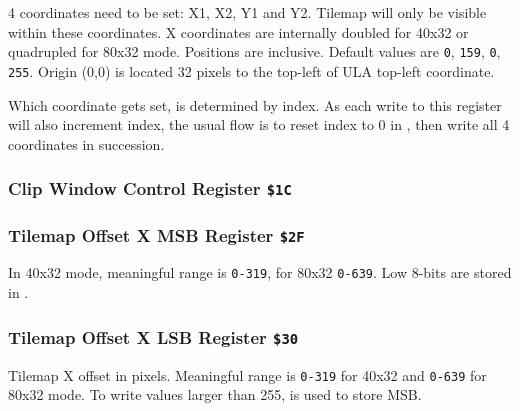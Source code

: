 \documentclass[12pt,twoside,openright,a4paper]{book}
\begin{document}
\begin{NextPort}
\end{NextPort}

4 coordinates need to be set: X1, X2, Y1 and Y2. Tilemap will only be visible within these coordinates. X coordinates are internally doubled for 40x32 or quadrupled for 80x32 mode. Positions are inclusive. Default values are {\tt 0}, {\tt 159}, {\tt 0}, {\tt 255}. Origin (0,0) is located 32 pixels to the top-left of ULA top-left coordinate.

Which coordinate gets set, is determined by index. As each write to this register will also increment index, the usual flow is to reset index to 0 in , then write all 4 coordinates in succession.


\subsubsection{Clip Window Control Register {\tt \$1C}}



\subsubsection{Tilemap Offset X MSB Register {\tt \$2F}}

\begin{NextPort}
\end{NextPort}

In 40x32 mode, meaningful range is {\tt 0-319}, for 80x32 {\tt 0-639}. Low 8-bits are stored in .


\subsubsection{Tilemap Offset X LSB Register {\tt \$30}}

\begin{NextPort}
\end{NextPort}

Tilemap X offset in pixels. Meaningful range is {\tt 0-319} for 40x32 and {\tt 0-639} for 80x32 mode. To write values larger than 255,  is used to store MSB.
\end{document}
